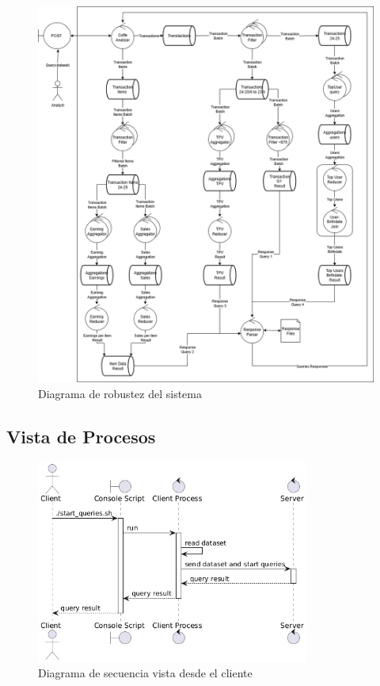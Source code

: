 \newpage
\begin{figure}[H]
    \centering
    \includegraphics[width=1\textwidth]{imagenes/vistas/robustez.png}
    \caption{Diagrama de robustez del sistema}
    \label{fig:robustez}
\end{figure}

\subsection{Vista de Procesos}

\begin{figure}[H]
    \centering
    \includegraphics[width=0.8\textwidth]{imagenes/vistas/secuencia1.jpg}
    \caption{Diagrama de secuencia vista desde el cliente}
    \label{fig:secuencia1}
\end{figure}

